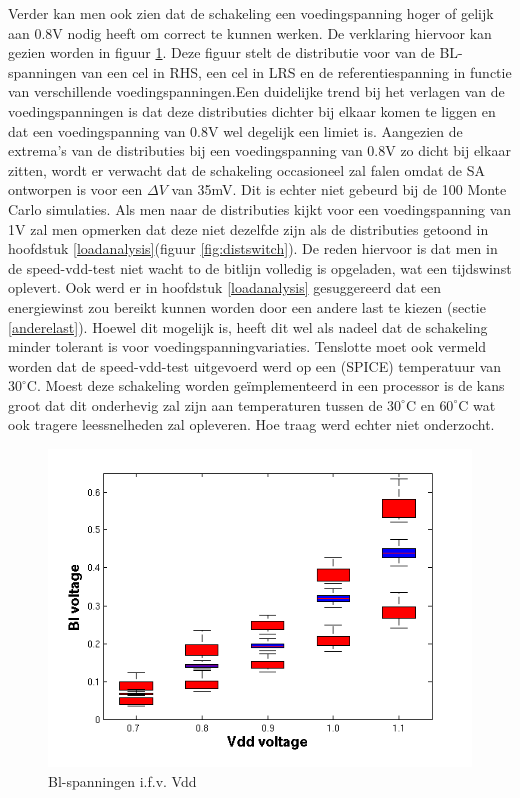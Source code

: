Verder kan men ook zien dat de schakeling een voedingspanning hoger of gelijk aan 0.8V nodig heeft om correct te kunnen werken. De verklaring hiervoor kan gezien worden in figuur \ref{fig:vblvdd}. Deze figuur stelt de distributie voor van de BL-spanningen van een cel in RHS, een cel in LRS en de referentiespanning in functie van verschillende voedingspanningen.Een duidelijke trend bij het verlagen van de voedingspanningen  is dat deze distributies dichter bij elkaar komen te liggen en dat een voedingspanning van 0.8V wel degelijk een limiet is. Aangezien de extrema's van de distributies bij een voedingspanning van 0.8V zo dicht bij elkaar zitten, wordt er verwacht dat de schakeling occasioneel zal falen omdat de SA ontworpen is voor een $\Delta V$ van 35mV. Dit is echter niet gebeurd bij de 100 Monte Carlo simulaties.
Als men naar de distributies kijkt voor een voedingspanning van 1V zal men opmerken dat deze niet dezelfde zijn als de distributies getoond in hoofdstuk \ref{loadanalysis}(figuur \ref{fig:distswitch}). De reden hiervoor is dat men in de speed-vdd-test niet wacht to de bitlijn volledig is opgeladen, wat een tijdswinst oplevert. Ook werd er in hoofdstuk \ref{loadanalysis} gesuggereerd dat een energiewinst zou bereikt kunnen worden door een andere last te kiezen (sectie \ref{anderelast}). Hoewel dit mogelijk is, heeft dit wel als nadeel dat de schakeling minder tolerant is voor voedingspanningvariaties. Tenslotte moet ook vermeld worden dat de speed-vdd-test uitgevoerd werd op een (SPICE) temperatuur van $30^{\circ}\mathrm{C}$. Moest deze schakeling worden geïmplementeerd in een processor is de kans groot dat dit onderhevig zal zijn aan temperaturen tussen de $30^{\circ}\mathrm{C}$ en $60^{\circ}\mathrm{C}$ wat ook tragere leessnelheden zal opleveren. Hoe traag werd echter niet onderzocht.

\begin{figure}[!ht]
  \centering
  \includegraphics[scale=0.8]{../fig/hfdst-final-vddbl.png}
  \caption[Bl-spanningen i.f.v. Vdd]{Bl-spanningen i.f.v. Vdd}
  \label{fig:vblvdd}
\end{figure}

